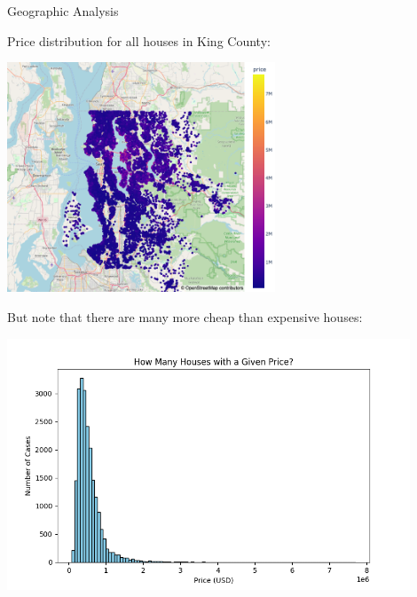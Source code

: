 \documentclass{beamer}
\begin{document}
\begin{frame}{Geographic Analysis}

Price distribution for all houses in King County: \pause

\begin{center}
\includegraphics[width=0.6\textwidth]{all_houses_mapbox.png} 
\end{center}

\end{frame}

\begin{frame}{}

But note that there are many more cheap than expensive houses: \pause

\begin{center}
\includegraphics[width=0.9\textwidth]{price_histo.png} 
\end{center}

\end{frame}
\end{document}
